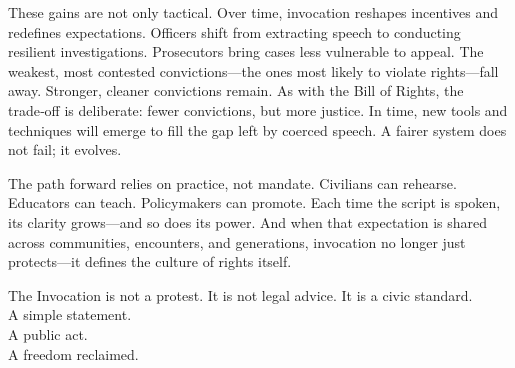These gains are not only tactical. Over time, invocation reshapes incentives and redefines expectations. Officers shift from extracting speech to conducting resilient investigations. Prosecutors bring cases less vulnerable to appeal. The weakest, most contested convictions—the ones most likely to violate rights—fall away. Stronger, cleaner convictions remain. As with the Bill of Rights, the trade‑off is deliberate: fewer convictions, but more justice. In time, new tools and techniques will emerge to fill the gap left by coerced speech. A fairer system does not fail; it evolves.

The path forward relies on practice, not mandate. Civilians can rehearse. Educators can teach. Policymakers can promote. Each time the script is spoken, its clarity grows—and so does its power. And when that expectation is shared across communities, encounters, and generations, invocation no longer just protects—it defines the culture of rights itself.

\bigskip
\noindent The Invocation is not a protest. It is not legal advice. It is a civic standard.\\
A simple statement.\\
A public act.\\
A freedom reclaimed.
